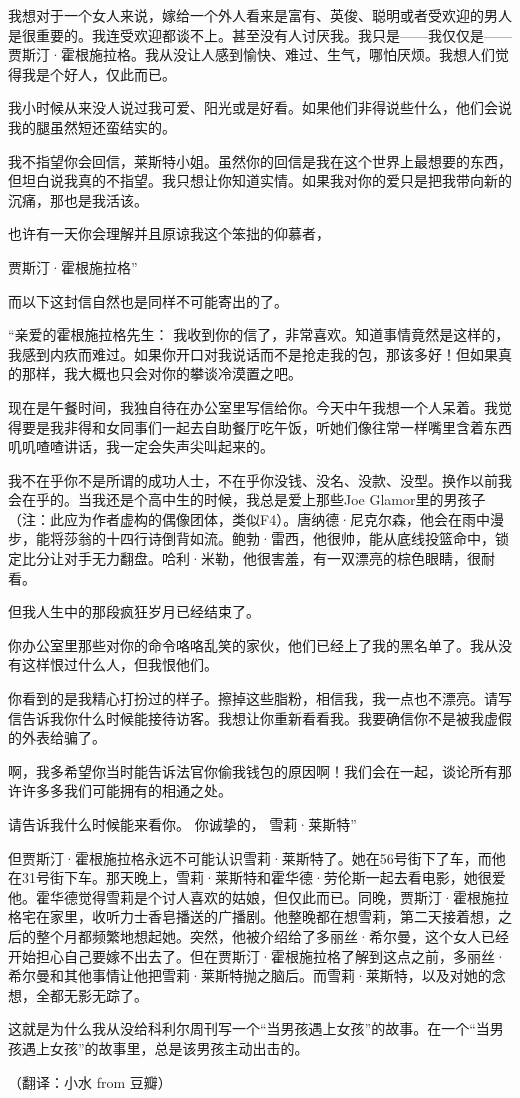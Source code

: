 我想对于一个女人来说，嫁给一个外人看来是富有、英俊、聪明或者受欢迎的男人是很重要的。我连受欢迎都谈不上。甚至没有人讨厌我。我只是——我仅仅是——贾斯汀·霍根施拉格。我从没让人感到愉快、难过、生气，哪怕厌烦。我想人们觉得我是个好人，仅此而已。

我小时候从来没人说过我可爱、阳光或是好看。如果他们非得说些什么，他们会说我的腿虽然短还蛮结实的。

我不指望你会回信，莱斯特小姐。虽然你的回信是我在这个世界上最想要的东西，但坦白说我真的不指望。我只想让你知道实情。如果我对你的爱只是把我带向新的沉痛，那也是我活该。

也许有一天你会理解并且原谅我这个笨拙的仰慕者，

贾斯汀·霍根施拉格”

而以下这封信自然也是同样不可能寄出的了。

“亲爱的霍根施拉格先生：
我收到你的信了，非常喜欢。知道事情竟然是这样的，我感到内疚而难过。如果你开口对我说话而不是抢走我的包，那该多好！但如果真的那样，我大概也只会对你的攀谈冷漠置之吧。

现在是午餐时间，我独自待在办公室里写信给你。今天中午我想一个人呆着。我觉得要是我非得和女同事们一起去自助餐厅吃午饭，听她们像往常一样嘴里含着东西叽叽喳喳讲话，我一定会失声尖叫起来的。

我不在乎你不是所谓的成功人士，不在乎你没钱、没名、没款、没型。换作以前我会在乎的。当我还是个高中生的时候，我总是爱上那些Joe Glamor里的男孩子（注：此应为作者虚构的偶像团体，类似F4）。唐纳德·尼克尔森，他会在雨中漫步，能将莎翁的十四行诗倒背如流。鲍勃·雷西，他很帅，能从底线投篮命中，锁定比分让对手无力翻盘。哈利·米勒，他很害羞，有一双漂亮的棕色眼睛，很耐看。

但我人生中的那段疯狂岁月已经结束了。

你办公室里那些对你的命令咯咯乱笑的家伙，他们已经上了我的黑名单了。我从没有这样恨过什么人，但我恨他们。

你看到的是我精心打扮过的样子。擦掉这些脂粉，相信我，我一点也不漂亮。请写信告诉我你什么时候能接待访客。我想让你重新看看我。我要确信你不是被我虚假的外表给骗了。

啊，我多希望你当时能告诉法官你偷我钱包的原因啊！我们会在一起，谈论所有那许许多多我们可能拥有的相通之处。

请告诉我什么时候能来看你。
你诚挚的，
雪莉·莱斯特”

但贾斯汀·霍根施拉格永远不可能认识雪莉·莱斯特了。她在56号街下了车，而他在31号街下车。那天晚上，雪莉·莱斯特和霍华德·劳伦斯一起去看电影，她很爱他。霍华德觉得雪莉是个讨人喜欢的姑娘，但仅此而已。同晚，贾斯汀·霍根施拉格宅在家里，收听力士香皂播送的广播剧。他整晚都在想雪莉，第二天接着想，之后的整个月都频繁地想起她。突然，他被介绍给了多丽丝·希尔曼，这个女人已经开始担心自己要嫁不出去了。但在贾斯汀·霍根施拉格了解到这点之前，多丽丝·希尔曼和其他事情让他把雪莉·莱斯特抛之脑后。而雪莉·莱斯特，以及对她的念想，全都无影无踪了。

这就是为什么我从没给科利尔周刊写一个“当男孩遇上女孩”的故事。在一个“当男孩遇上女孩”的故事里，总是该男孩主动出击的。

（翻译：小水 from 豆瓣）

